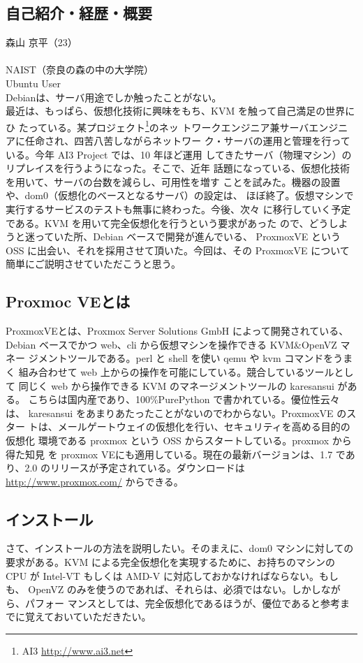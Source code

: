 \documentclass[mingoth,a4paper]{jsarticle}
\begin{document}
\label{sec:moriyama}
\subsection{自己紹介・経歴・概要}
森山 京平（23）\\
\\
NAIST（奈良の森の中の大学院）\\
Ubuntu User\\
Debianは、サーバ用途でしか触ったことがない。\\
最近は、もっぱら、仮想化技術に興味をもち、KVM を触って自己満足の世界にひ
たっている。某プロジェクト\footnote{AI3 \url{http://www.ai3.net}}のネッ
トワークエンジニア兼サーバエンジニアに任命され、四苦八苦しながらネットワー
ク・サーバの運用と管理を行っている。今年 AI3 Project では、10 年ほど運用
してきたサーバ（物理マシン）のリプレイスを行うようになった。そこで、近年
話題になっている、仮想化技術を用いて、サーバの台数を減らし、可用性を増す
ことを試みた。機器の設置や、dom0（仮想化のベースとなるサーバ）の設定は、
ほぼ終了。仮想マシンで実行するサービスのテストも無事に終わった。今後、次々
に移行していく予定である。KVM を用いて完全仮想化を行うという要求があった
ので、どうしようと迷っていた所、Debian ベースで開発が進んでいる、
ProxmoxVE という OSS に出会い、それを採用させて頂いた。今回は、その
ProxmoxVE について簡単にご説明させていただこうと思う。

\subsection{Proxmoc VEとは}
ProxmoxVEとは、Proxmox Server Solutions GmbH によって開発されている、
Debian ベースでかつ web、cli から仮想マシンを操作できる KVM\&OpenVZ マネー
ジメントツールである。perl と shell を使い qemu や kvm コマンドをうまく
組み合わせて web 上からの操作を可能にしている。競合しているツールとして
同じく web から操作できる KVM のマネージメントツールの karesansui がある。
こちらは国内産であり、100\%PurePython で書かれている。優位性云々は、
karesansui をあまりあたったことがないのでわからない。ProxmoxVE のスター
トは、メールゲートウェイの仮想化を行い、セキュリティを高める目的の仮想化
環境である proxmox という OSS からスタートしている。proxmox から得た知見
を proxmox VEにも適用している。現在の最新バージョンは、1.7 であり、2.0
のリリースが予定されている。ダウンロードは \url{http://www.proxmox.com/}
からできる。

\subsection{インストール}
さて、インストールの方法を説明したい。そのまえに、dom0 マシンに対しての
要求がある。KVM による完全仮想化を実現するために、お持ちのマシンの CPU
が Intel-VT もしくは AMD-V に対応しておかなければならない。もしも、
OpenVZ のみを使うのであれば、それらは、必須ではない。しかしながら、パフォー
マンスとしては、完全仮想化であるほうが、優位であると参考までに覚えておいていただきたい。
\end{document}
